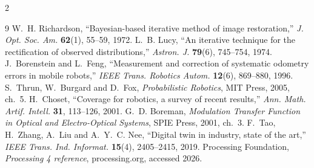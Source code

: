 \documentclass[a4paper,10pt]{article}
\begin{document}
\begin{multicols*}{2}
\renewcommand{\refname}{}
\begin{thebibliography}{9}
\small
{} W.~H. Richardson, ``Bayesian-based iterative method of image
restoration,'' \emph{J. Opt. Soc. Am.} \textbf{62}(1), 55--59, 1972.
 L.~B. Lucy, ``An iterative technique for the rectification of
observed distributions,'' \emph{Astron. J.} \textbf{79}(6), 745--754, 1974.
 J.~Borenstein and L.~Feng, ``Measurement and correction of
systematic odometry errors in mobile robots,'' \emph{IEEE Trans. Robotics
Autom.} \textbf{12}(6), 869--880, 1996.
 S.~Thrun, W.~Burgard and D.~Fox, \emph{Probabilistic Robotics},
MIT Press, 2005, ch.~5.
 H.~Choset, ``Coverage for robotics, a survey of recent
results,'' \emph{Ann. Math. Artif. Intell.} \textbf{31}, 113--126, 2001.
 G.~D. Boreman, \emph{Modulation Transfer Function in Optical
and Electro-Optical Systems}, SPIE Press, 2001, ch.~3.
 F.~Tao, H.~Zhang, A.~Liu and A.~Y.~C. Nee, ``Digital twin in
industry, state of the art,'' \emph{IEEE Trans. Ind. Informat.}
\textbf{15}(4), 2405--2415, 2019.
 Processing Foundation, \emph{Processing 4 reference},
processing.org, accessed 2026.
\end{thebibliography}

\end{multicols*}
\end{document}
